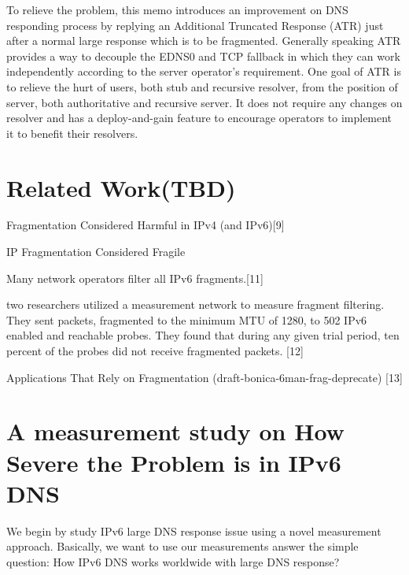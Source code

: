 To relieve the problem, this memo introduces an improvement on
DNS responding process by replying an Additional Truncated Response
(ATR) just after a normal large response which is to be fragmented.
Generally speaking ATR provides a way to decouple the EDNS0 and TCP
fallback in which they can work independently according to the server
operator's requirement.  One goal of ATR is to relieve the hurt of
users, both stub and recursive resolver, from the position of server,
both authoritative and recursive server.  It does not require any
changes on resolver and has a deploy-and-gain feature to encourage
operators to implement it to benefit their resolvers.



\section{Related Work(TBD)}



Fragmentation Considered Harmful in IPv4 (and IPv6)[9]

IP Fragmentation Considered Fragile 

Many network operators filter all IPv6 fragments.[11]

two researchers utilized a measurement network to measure 
fragment filtering.  They sent packets, fragmented to the 
minimum MTU of 1280, to 502 IPv6 enabled and reachable 
probes. They found that during any given trial period, 
ten percent of the probes did not receive fragmented packets. [12]

Applications That Rely on Fragmentation (draft-bonica-6man-frag-deprecate) [13]




\section{A measurement study on How Severe the Problem is in IPv6 DNS}

We begin by study IPv6 large DNS response issue using a 
novel measurement approach. Basically, we want to use our 
measurements answer the simple question: How IPv6 DNS 
works worldwide with large DNS response? 

